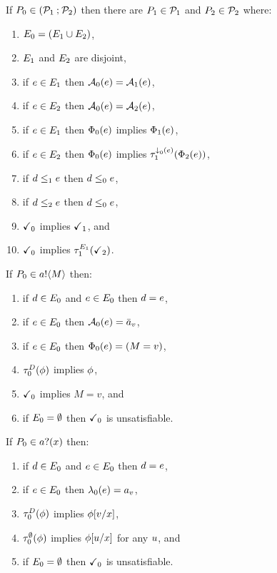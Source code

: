 \begin{definition}
  If $\aPS_0 \in (\aPSS_1\sSEMI\aPSS_2)$ then
  there are $\aPS_1\in\aPSS_1$ and $\aPS_2\in\aPSS_2$ where:
  \begin{enumerate}
  \item $\aEvs_0 = (\aEvs_1\cup\aEvs_2)$,
  \item $\aEvs_1$ and  $\aEvs_2$ are disjoint,
  \item if $\aEv\in\aEvs_1$ then $\labelingAct_0(\aEv) = \labelingAct_1(\aEv)$, 
  \item if $\aEv\in\aEvs_2$ then $\labelingAct_0(\aEv) = \labelingAct_2(\aEv)$,
  \item if $\aEv\in\aEvs_1$ then $\labelingForm_0(\aEv)$ implies $\labelingForm_1(\aEv)$, 
  \item if $\aEv\in\aEvs_2$ then $\labelingForm_0(\aEv)$ implies $\aTr[\downclose_0(e)]_1(\labelingForm_2(\aEv))$,
  \item if $\bEv\le_1\aEv$ then $\bEv\le_0\aEv$,
  \item if $\bEv\le_2\aEv$ then $\bEv\le_0\aEv$,
  \item $\complete_0$ implies $\complete_1$, and
  \item $\complete_0$ implies $\aTr[\aEvs_1]_1(\complete_2)$.
  \end{enumerate}
\end{definition}

\begin{definition}
  If $\aPS_0 \in \sSEND\aChan{\aExp}$ then:
  \begin{enumerate}
  \item if $\bEv\in\aEvs_0$ and $\aEv\in\aEvs_0$ then $\bEv=\aEv$,
  \item if $\aEv\in\aEvs_0$ then $\labelingAct_0(\aEv) = \send\aChan{\aVal}$,
  \item if $\aEv\in\aEvs_0$ then $\labelingForm_0(\aEv) = (M = v)$,
  \item $\aTr[\bEvs]_0(\aForm)$ implies $\aForm$,
  \item $\complete_0$ implies $M = v$, and
  \item if $\aEvs_0=\emptyset$ then $\complete_0$ is unsatisfiable.
  \end{enumerate}
\end{definition}

\begin{definition}
  If $\aPS_0 \in \sRECV\aChan{\aVar}$ then:
  \begin{enumerate}
  \item if $\bEv\in\aEvs_0$ and $\aEv\in\aEvs_0$ then $\bEv=\aEv$,
  \item if $\aEv\in\aEvs_0$ then $\labeling_0(\aEv) = \recv\aChan{\aVal}$,
  \item $\aTr[\bEvs]_0(\aForm)$ implies $\phi[\aVal/\aVar]$,
  \item $\aTr[\emptyset]_0(\aForm)$ implies $\phi[\bVal/\aVar]$ for any $\bVal$, and
  \item if $\aEvs_0=\emptyset$ then $\complete_0$ is unsatisfiable.
  \end{enumerate}
\end{definition}
